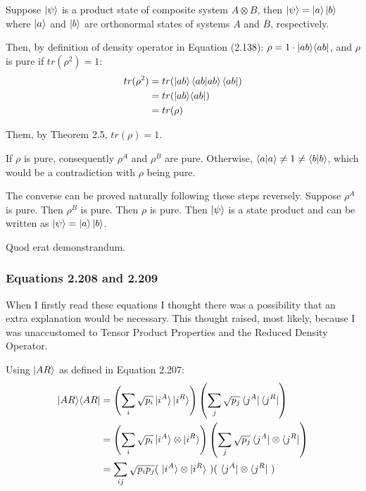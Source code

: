 Suppose $\ket{\psi}$ is a product state of composite system
$A \otimes B$, then $\ket{\psi} = \ket{a}\ket{b}$ where
$\ket{a}$ and $\ket{b}$ are orthonormal states of systems
$A$ and $B$, respectively.

Then, by definition of density operator in Equation (2.138):
$\rho = 1 \cdot \mathop{\mathinner{ |{ab}\rangle \langle{ab}|}}$, and $\rho$ is pure if $tr(\rho^2) = 1$:
\begin{align}
    tr(\rho^2) &= tr(\ket{ab}\mathop{\mathinner{ \langle{ab}|{ab}\rangle}}\bra{ab}) \\
    &= tr(\mathop{\mathinner{ |{ab}\rangle \langle{ab}|}}) \\
    &= tr(\rho)
\end{align}

Them, by Theorem 2.5, $tr(\rho) = 1$.

If $\rho$ is pure, consequently $\rho^A$ and $\rho^B$ are pure.
Otherwise, $\mathop{\mathinner{ \langle{a}|{a}\rangle}} \neq 1 \neq \mathop{\mathinner{ \langle{b}|{b}\rangle}}$,
which would be a contradiction with $\rho$ being pure.

The converse can be proved naturally following these steps reversely.
Suppose $\rho^A$ is pure. Then $\rho^B$ is pure. Then $\rho$ is pure.
Then $\ket{\psi}$ is a state product and can be written as
$\ket{\psi} = \ket{a} \ket{b}$.

Quod erat demonstrandum.


\subsubsection{Equations 2.208 and 2.209}
\label{sec:nielsen-and-chuang-equations-2-208-209}
When I firstly read these equations I thought there was a possibility that
an extra explanation would be necessary.
This thought raised, most likely,
because I was unaccustomed to Tensor Product Properties and
the Reduced Density Operator.

Using $\ket{AR}$ as defined in Equation 2.207:
\begin{align}
    \mathop{\mathinner{ |{AR}\rangle \langle{AR}|}} &= \left( \sum_i \sqrt{p_i} \ket{i^A}\ket{i^R} \right)
        \left( \sum_j \sqrt{p_j} \bra{j^A}\bra{j^R} \right) \\
    &= \left( \sum_i \sqrt{p_i} \ket{i^A} \otimes \ket{i^R} \right)
        \left( \sum_j \sqrt{p_j} \bra{j^A} \otimes \bra{j^R} \right) \\
    &= \sum_{ij} \sqrt{p_i p_j} (\ \ket{i^A} \otimes \ket{i^R}\ )
        (\ \bra{j^A} \otimes \bra{j^R}\ )
\end{align}

